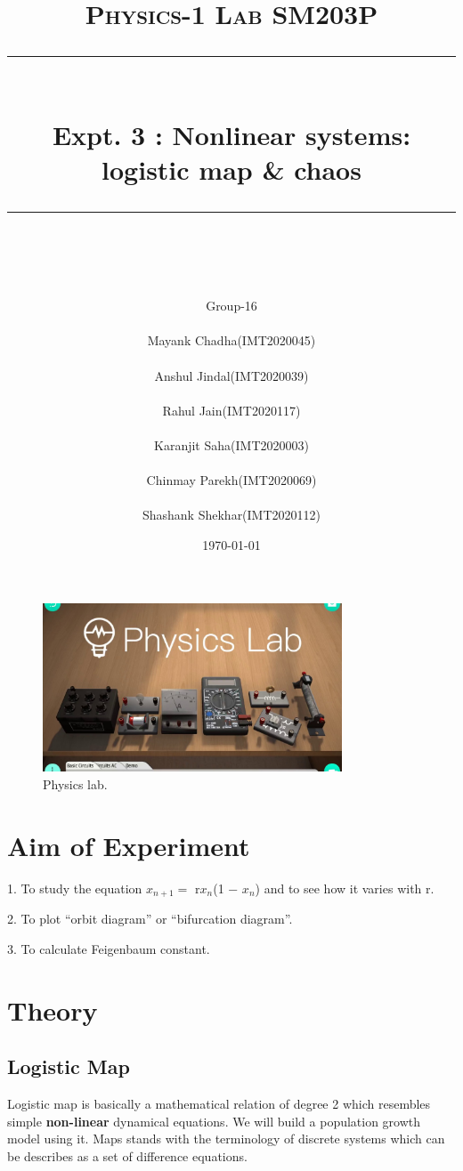 \documentclass[11pt]{scrartcl} %
\title{	
	\normalfont\normalsize
	\textsc{\Huge Physics-1 Lab SM203P}\\ %
	\vspace{25pt} %
	\rule{\linewidth}{0.5pt}\\ %
	\vspace{20pt} %
	{\huge Expt. 3 : Nonlinear systems: logistic map & chaos}\\ %
	\vspace{12pt} %
	\rule{\linewidth}{2pt}\\ %
	\vspace{12pt} %
}
\author{\Huge Group-16\\
\\
\LARGE Mayank Chadha(IMT2020045)\\
\\
\LARGE Anshul Jindal(IMT2020039)\\
\\
\LARGE Rahul Jain(IMT2020117)\\
\\
\LARGE Karanjit Saha(IMT2020003)\\
\\
\LARGE Chinmay Parekh(IMT2020069)\\
\\
\LARGE Shashank Shekhar(IMT2020112)} %
\date{\normalsize\today} %
\begin{document}
\maketitle %

\begin{figure}[h] %
	\centering
	\includegraphics[width=\textwidth, height=5cm]{first.jpg} %
	\caption{Physics lab.}
\end{figure}

\section{Aim of Experiment}
1. To study the equation $x_{n+1} =$ r$x_n$(1 − $x_n$) and to see how it varies with r.\par
2.  To plot “orbit diagram” or “bifurcation diagram”. \par
3. To calculate Feigenbaum constant.  \par





\section{Theory}


\subsection{Logistic Map}
Logistic map is basically a mathematical relation of degree 2 which resembles simple \textbf{non-linear} dynamical equations. We will build a population growth model using it. Maps stands with the terminology of discrete systems which can be describes as a set of difference equations.\par
\end{document}
